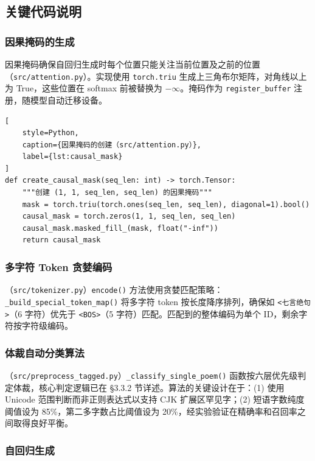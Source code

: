 \documentclass[a4paper, 12pt, centering, AutoFakeBold]{article}
\begin{document}
\subsection{关键代码说明}

\subsubsection{因果掩码的生成}

因果掩码确保自回归生成时每个位置只能关注当前位置及之前的位置（\texttt{src/attention.py}）。实现使用 \texttt{torch.triu} 生成上三角布尔矩阵，对角线以上为 True，这些位置在 softmax 前被替换为 $-\infty$。掩码作为 \texttt{register\_buffer} 注册，随模型自动迁移设备。

\begin{lstlisting}[
    style=Python,
    caption={因果掩码的创建（src/attention.py）},
    label={lst:causal_mask}
]
def create_causal_mask(seq_len: int) -> torch.Tensor:
    """创建 (1, 1, seq_len, seq_len) 的因果掩码"""
    mask = torch.triu(torch.ones(seq_len, seq_len), diagonal=1).bool()
    causal_mask = torch.zeros(1, 1, seq_len, seq_len)
    causal_mask.masked_fill_(mask, float("-inf"))
    return causal_mask
\end{lstlisting}

\subsubsection{多字符 Token 贪婪编码}

（\texttt{src/tokenizer.py}）\texttt{encode()} 方法使用贪婪匹配策略：\texttt{\_build\_special\_token\_map()} 将多字符 token 按长度降序排列，确保如 \texttt{<七言绝句>}（6 字符）优先于 \texttt{<BOS>}（5 字符）匹配。匹配到的整体编码为单个 ID，剩余字符按字符级编码。

\subsubsection{体裁自动分类算法}

（\texttt{src/preprocess\_tagged.py}）\texttt{\_classify\_single\_poem()} 函数按六层优先级判定体裁，核心判定逻辑已在 \S3.3.2 节详述。算法的关键设计在于：(1) 使用 Unicode 范围判断而非正则表达式以支持 CJK 扩展区罕见字；(2) 短语字数纯度阈值设为 85\%，第二多字数占比阈值设为 20\%，经实验验证在精确率和召回率之间取得良好平衡。

\subsubsection{自回归生成}
\end{document}

